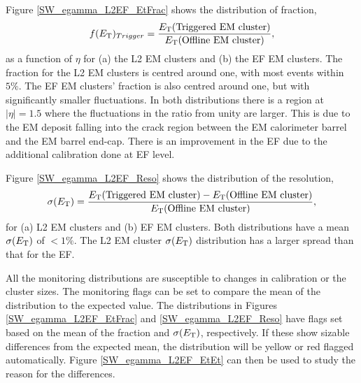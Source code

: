 Figure \ref{SW_egamma_L2EF_EtFrac} shows the distribution of \et{} fraction,
\begin{equation}
f(\mbox{$E_{\rm T}$}{})_{Trigger}=\frac{\mbox{$E_{\rm T}$}{}(\rm{Triggered~EM~cluster})}{\mbox{$E_{\rm T}$}{}(\rm{Offline~EM~cluster})},
\label{SW:EtFrac}
\end{equation}
as a function of $\eta{}$ for (a) the L2 EM clusters and (b) the EF EM clusters.
The \et{} fraction for the L2 EM clusters is centred around one, with most events within $5\%$.
The EF EM clusters' \et{} fraction is also centred around one, but with significantly smaller fluctuations.
In both distributions there is a region at $|\eta{}|=1.5$ where the fluctuations in the ratio from unity are larger.
This is due to the EM deposit falling into the crack region between the EM calorimeter barrel and the EM barrel end-cap.
There is an improvement in the EF due to the additional calibration done at EF level. 

Figure \ref{SW_egamma_L2EF_Reso} shows the distribution of the \et{} resolution,
\begin{equation}
\sigma(\mbox{$E_{\rm T}$}{}) =\frac{\mbox{$E_{\rm T}$}{}(\rm{Triggered~EM~cluster})-\mbox{$E_{\rm T}$}{}(\rm{Offline~EM~cluster})}{\mbox{$E_{\rm T}$}{}(\rm{Offline~EM~cluster})},
\label{SW:EtReso}
\end{equation}
for (a) L2 EM clusters and (b) EF EM clusters.
Both distributions have a mean $\sigma(\mbox{$E_{\rm T}$}{})$ of $<1\%$. 
The L2 EM cluster $\sigma(\mbox{$E_{\rm T}$}{})$ distribution has a larger spread than that for the EF.


All the monitoring distributions are susceptible to changes in calibration or the cluster sizes. 
The monitoring flags can be set to compare the mean of the distribution to the expected value.
The distributions in Figures \ref{SW_egamma_L2EF_EtFrac} and \ref{SW_egamma_L2EF_Reso} have flags set based on the mean of the \et{} fraction and $\sigma(\mbox{$E_{\rm T}$}{})$, respectively. 
If these show sizable differences from the expected mean, the distribution will be yellow or red flagged automatically.
Figure \ref{SW_egamma_L2EF_EtEt} can then be used to study the reason for the differences.

